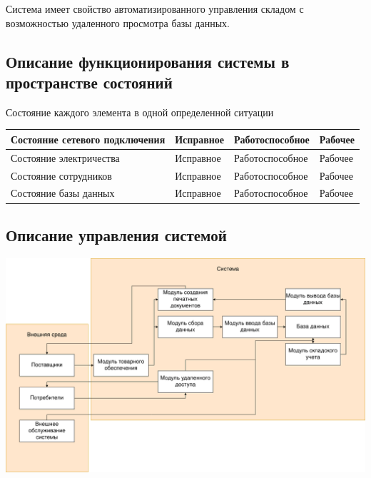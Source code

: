 \documentclass[14pt]{extarticle}
\begin{document}
Система имеет свойство автоматизированного управления складом с возможностью удаленного просмотра базы данных.

\subsection{Описание функционирования системы в пространстве состояний}


Состояние каждого элемента в одной определенной ситуации

\begin{tabular}{|p{}|p{}|p{}|p{}|}
	\hline
Состояние сетевого подключения & Исправное & Работоспособное & Рабочее \\ \hline
Состояние электричества & Исправное & Работоспособное & Рабочее \\ \hline
Состояние сотрудников & Исправное & Работоспособное & Рабочее \\ \hline
Состояние базы данных  & Исправное & Работоспособное & Рабочее \\ \hline
\end{tabular}

\subsection{Описание управления системой}


\includegraphics[width=\textwidth]{External.drawio}
\end{document}
